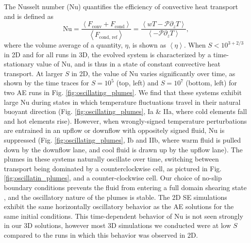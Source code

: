 \documentclass[aps, pre, onecolumn, nofootinbib, notitlepage, groupedaddress, amsfonts, amssymb, amsmath, longbibliography]{revtex4-1}
\newcommand{\angles}[1]{\ensuremath{\left\langle #1 \right\rangle}}
\begin{document}
The Nusselt number (Nu) quantifies the efficiency of convective heat transport
and is defined as
\begin{equation}
\text{Nu} = \frac{\angles{F_{\text{conv}} + F_{\text{cond}}}}{\angles{F_{\text{cond, ref}}}}
 = \frac{\angles{wT - \mathcal{P}\partial_z T}}{\angles{- \mathcal{P} \partial_z T}},
\end{equation}
where the volume average of a quantity, $\eta$, is shown as $\angles{\eta}$.
When $S < 10^{3+2/3}$ in 2D and for all runs in 3D, 
the evolved system is characterized by a time-stationary value of Nu, and is thus
in a state of constant convective heat transport.
At larger $S$ in 2D, the value of Nu varies significantly over time,
as shown by the time traces for $S = 10^5$ (top, left) and $S = 10^7$ (bottom, left) for two
AE runs in Fig. \ref{fig:oscillating_plumes}. We find that these systems exhibit
large Nu during
states in which temperature fluctuations travel in their natural buoyant
direction (Fig. \ref{fig:oscillating_plumes}, Ia \& IIa, where cold elements fall and hot elements rise).
However, when wrongly-signed temperature perturbations are entrained in an upflow or downflow
with oppositely signed fluid, Nu is suppressed (Fig. \ref{fig:oscillating_plumes}, Ib and IIb, 
where warm fluid is pulled down by the downflow
lane, and cool fluid is drawn up by the upflow lane). The plumes in these
systems naturally oscillate over time, switching between transport being dominated
by a counterclockwise cell, as pictured in Fig. \ref{fig:oscillatin_plumes}, and
a counter-clockwise cell. Our choice of no-slip
boundary conditions prevents the fluid from entering a full domain shearing state 
\cite{goluskin&all2014}, and the
oscillatory nature of the plumes is stable.
The 2D SE simulations exhibit the same horizontally
oscillatory behavior as the AE solutions for the same initial conditions. 
This time-dependent behavior of Nu is not seen strongly in our 3D solutions,
however most 3D simulations we conducted were at low $S$ compared to the runs in
which this behavior was observed in 2D.
\end{document}
